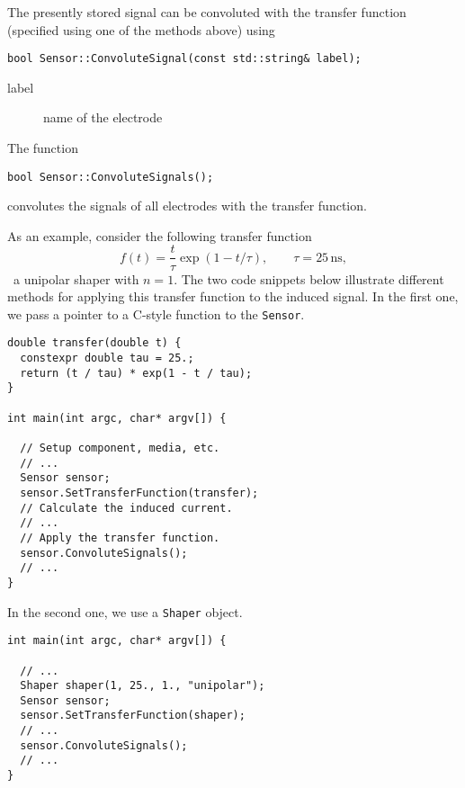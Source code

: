 The presently stored signal can be convoluted with the 
transfer function (specified using one of the methods above) using 
\begin{lstlisting}
bool Sensor::ConvoluteSignal(const std::string& label);
\end{lstlisting}
\begin{description}
  \item[label] name of the electrode
\end{description}
The function
\begin{lstlisting}
bool Sensor::ConvoluteSignals();
\end{lstlisting}
convolutes the signals of all electrodes with the transfer function.

As an example, consider the following transfer function
\begin{equation*}
  f\left(t\right) = \frac{t}{\tau}\exp\left(1 - t/\tau\right), \qquad
  \tau = 25\,\text{ns},
\end{equation*}
\ie~a unipolar shaper with $n = 1$. The two code snippets 
below illustrate different methods for applying this transfer function 
to the induced signal. In the first one, we pass a pointer to a 
C-style function to the \texttt{Sensor}.
\begin{lstlisting}
double transfer(double t) {
  constexpr double tau = 25.;
  return (t / tau) * exp(1 - t / tau);
}

int main(int argc, char* argv[]) {

  // Setup component, media, etc.
  // ...
  Sensor sensor;
  sensor.SetTransferFunction(transfer);
  // Calculate the induced current.
  // ...
  // Apply the transfer function.
  sensor.ConvoluteSignals();
  // ...
}
\end{lstlisting}

In the second one, we use a \texttt{Shaper} object.
\begin{lstlisting}
int main(int argc, char* argv[]) {

  // ...
  Shaper shaper(1, 25., 1., "unipolar");
  Sensor sensor;
  sensor.SetTransferFunction(shaper);
  // ...
  sensor.ConvoluteSignals();
  // ...
}
\end{lstlisting}

